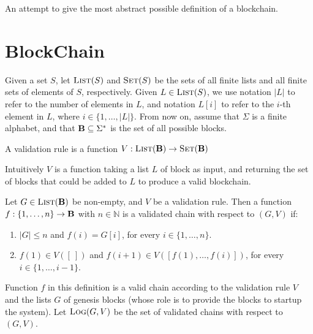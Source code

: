 
An attempt to give the most abstract possible definition of a blockchain.

\section{BlockChain}
Given a set $S$, let $\text{\sc List}(S)$ and $\text{\sc Set}(S)$ be the sets of all finite lists and all finite sets of elements of $S$, respectively. Given $L \in \text{\sc List}(S)$, we use notation $|L|$ to refer to the number of elements in $L$, and notation $L[i]$ to refer to the $i$-th element in $L$, where $i \in \{1, \ldots, |L|\}$. From now on, assume that $\Sigma$ is a finite alphabet, and that $\text{\bf B} \subseteq \Sigma^*$ is the set of all possible blocks. 
\begin{mydef}
A validation rule is a function $V : \text{\sc List}(\text{\bf B}) \to \text{\sc Set}(\text{\bf B})$
\end{mydef}
Intuitively $V$ is a function taking a list $L$ of block as input, and returning the set of blocks that could be added to $L$ to produce a valid blockchain.

\begin{mydef}
Let $G \in \text{\sc List}(\text{\bf B})$ be non-empty, and $V$ be a validation rule. Then a function $f : \{1, \ldots, n\} \rightarrow \text{\bf B}$ with $n \in \mathbb{N}$ is a validated chain with respect to $(G,V)$ if:
\begin{enumerate}
\item $|G| \leq n$ and $f(i) = G[i]$, for every $i \in \{1, \ldots, n\}$.

\item $f(1) \in V([\ ])$ and $f(i+1) \in V([f(1), \ldots, f(i)])$, for every $i \in \{1, \ldots, i-1\}$.
\end{enumerate}
\end{mydef}
Function $f$ in this definition is a valid chain according to the validation rule $V$ and the lists $G$ of genesis blocks (whose role is to provide the blocks to startup the system). Let $\text{\sc Log}(G,V)$ be the set of validated chains with respect to $(G,V)$.

%
%

